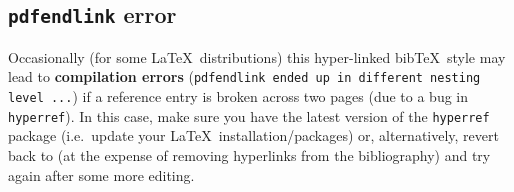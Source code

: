 \documentclass[review,journal]{vgtc}              %
\begin{document}
		
		\subsection{\texttt{pdfendlink} error}
		
		Occasionally (for some \LaTeX\ distributions) this hyper-linked bib\TeX\ style may lead to \textbf{compilation errors} (\texttt{pdfendlink ended up in different nesting level ...}) if a reference entry is broken across two pages (due to a bug in \verb|hyperref|).
		In this case, make sure you have the latest version of the \verb|hyperref| package (i.e.\ update your \LaTeX\ installation/packages) or, alternatively, revert back to \verb|| (at the expense of removing hyperlinks from the bibliography) and try \verb|| again after some more editing.
		
	
\end{document}
